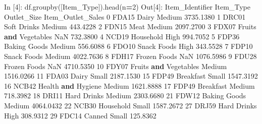 \documentclass[
]{book}
\newenvironment{Shaded}{\begin{snugshade}}{\end{snugshade}}
\newcommand{\DecValTok}[1]{\textcolor[rgb]{0.00,0.00,0.81}{#1}}
\newcommand{\FloatTok}[1]{\textcolor[rgb]{0.00,0.00,0.81}{#1}}
\newcommand{\KeywordTok}[1]{\textcolor[rgb]{0.13,0.29,0.53}{\textbf{#1}}}
\newcommand{\NormalTok}[1]{#1}
\newcommand{\OperatorTok}[1]{\textcolor[rgb]{0.81,0.36,0.00}{\textbf{#1}}}
\newcommand{\StringTok}[1]{\textcolor[rgb]{0.31,0.60,0.02}{#1}}
\begin{document}
\begin{Shaded}
\begin{Highlighting}[]
\NormalTok{In [}\DecValTok{4}\NormalTok{]: df.groupby([}\StringTok{\textquotesingle{}Item\_Type\textquotesingle{}}\NormalTok{]).head(n}\OperatorTok{=}\DecValTok{2}\NormalTok{)}
\NormalTok{Out[}\DecValTok{4}\NormalTok{]:}
\NormalTok{    Item\_Identifier              Item\_Type Outlet\_Size  Item\_Outlet\_Sales}
\DecValTok{0}\NormalTok{             FDA15                  Dairy      Medium          }\FloatTok{3735.1380}
\DecValTok{1}\NormalTok{             DRC01            Soft Drinks      Medium           }\FloatTok{443.4228}
\DecValTok{2}\NormalTok{             FDN15                   Meat      Medium          }\FloatTok{2097.2700}
\DecValTok{3}\NormalTok{             FDX07  Fruits }\KeywordTok{and}\NormalTok{ Vegetables         NaN           }\FloatTok{732.3800}
\DecValTok{4}\NormalTok{             NCD19              Household        High           }\FloatTok{994.7052}
\DecValTok{5}\NormalTok{             FDP36           Baking Goods      Medium           }\FloatTok{556.6088}
\DecValTok{6}\NormalTok{             FDO10            Snack Foods        High           }\FloatTok{343.5528}
\DecValTok{7}\NormalTok{             FDP10            Snack Foods      Medium          }\FloatTok{4022.7636}
\DecValTok{8}\NormalTok{             FDH17           Frozen Foods         NaN          }\FloatTok{1076.5986}
\DecValTok{9}\NormalTok{             FDU28           Frozen Foods         NaN          }\FloatTok{4710.5350}
\DecValTok{10}\NormalTok{            FDY07  Fruits }\KeywordTok{and}\NormalTok{ Vegetables      Medium          }\FloatTok{1516.0266}
\DecValTok{11}\NormalTok{            FDA03                  Dairy       Small          }\FloatTok{2187.1530}
\DecValTok{15}\NormalTok{            FDP49              Breakfast       Small          }\FloatTok{1547.3192}
\DecValTok{16}\NormalTok{            NCB42     Health }\KeywordTok{and}\NormalTok{ Hygiene      Medium          }\FloatTok{1621.8888}
\DecValTok{17}\NormalTok{            FDP49              Breakfast      Medium           }\FloatTok{718.3982}
\DecValTok{18}\NormalTok{            DRI11            Hard Drinks      Medium          }\FloatTok{2303.6680}
\DecValTok{21}\NormalTok{            FDW12           Baking Goods      Medium          }\FloatTok{4064.0432}
\DecValTok{22}\NormalTok{            NCB30              Household       Small          }\FloatTok{1587.2672}
\DecValTok{27}\NormalTok{            DRJ59            Hard Drinks        High           }\FloatTok{308.9312}
\DecValTok{29}\NormalTok{            FDC14                 Canned       Small           }\FloatTok{125.8362}

\end{Highlighting}
\end{Shaded}
\end{document}
